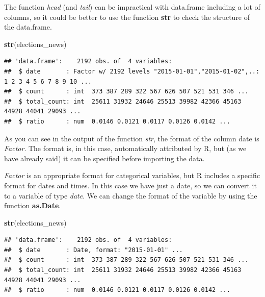 \documentclass[
]{article}
\newenvironment{Shaded}{\begin{snugshade}}{\end{snugshade}}
\newcommand{\KeywordTok}[1]{\textcolor[rgb]{0.13,0.29,0.53}{\textbf{#1}}}
\newcommand{\NormalTok}[1]{#1}
\newcommand{\OperatorTok}[1]{\textcolor[rgb]{0.81,0.36,0.00}{\textbf{#1}}}
\newcommand{\StringTok}[1]{\textcolor[rgb]{0.31,0.60,0.02}{#1}}
\begin{document}
The function \emph{head} (and \emph{tail}) can be impractical with data.frame including a lot of columns, so it could be better to use the function \textbf{str} to check the structure of the data.frame.

\begin{Shaded}
\begin{Highlighting}[]
\KeywordTok{str}\NormalTok{(elections_news)}
\end{Highlighting}
\end{Shaded}

\begin{verbatim}
## 'data.frame':    2192 obs. of  4 variables:
##  $ date       : Factor w/ 2192 levels "2015-01-01","2015-01-02",..: 1 2 3 4 5 6 7 8 9 10 ...
##  $ count      : int  373 387 289 322 567 626 507 521 531 346 ...
##  $ total_count: int  25611 31932 24646 25513 39982 42366 45163 44928 44041 29093 ...
##  $ ratio      : num  0.0146 0.0121 0.0117 0.0126 0.0142 ...
\end{verbatim}

As you can see in the output of the function \emph{str}, the format of the column date is \emph{Factor}. The format is, in this case, automatically attributed by R, but (as we have already said) it can be specified before importing the data.

\emph{Factor} is an appropriate format for categorical variables, but R includes a specific format for dates and times. In this case we have just a date, so we can convert it to a variable of type \emph{date}. We can change the format of the variable by using the function \textbf{as.Date}.

\begin{Shaded}
\end{Shaded}

\begin{Shaded}
\begin{Highlighting}[]
\KeywordTok{str}\NormalTok{(elections_news)}
\end{Highlighting}
\end{Shaded}

\begin{verbatim}
## 'data.frame':    2192 obs. of  4 variables:
##  $ date       : Date, format: "2015-01-01" ...
##  $ count      : int  373 387 289 322 567 626 507 521 531 346 ...
##  $ total_count: int  25611 31932 24646 25513 39982 42366 45163 44928 44041 29093 ...
##  $ ratio      : num  0.0146 0.0121 0.0117 0.0126 0.0142 ...
\end{verbatim}
\end{document}
